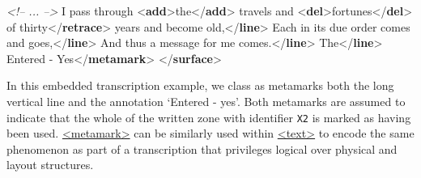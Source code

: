\begin{shaded}
\textit{<!-- ... -->}\mbox{}\newline 
\hspace*{1em}I pass through {<\textbf{add}>}the{</\textbf{add}>} travels and {<\textbf{del}>}fortunes{</\textbf{del}>} of\mbox{}\newline 
\hspace*{1em}thirty{</\textbf{retrace}>}\mbox{}\newline 
\hspace*{1em}\mbox{}\newline 
\hspace*{1em}years and become old,{</\textbf{line}>}\mbox{}\newline 
\hspace*{1em}Each in its due order comes and goes,{</\textbf{line}>}\mbox{}\newline 
\hspace*{1em}And thus a message for me comes.{</\textbf{line}>}\mbox{}\newline 
\hspace*{1em}The{</\textbf{line}>}\mbox{}\newline 
{}\mbox{}\newline 
{}Entered - Yes{</\textbf{metamark}>}\mbox{}\newline 
{</\textbf{surface}>}\end{shaded}\egroup\par \par
In this embedded transcription example, we class as metamarks both the long vertical line and the annotation ‘Entered - yes’.  Both metamarks are assumed to indicate that the whole of the written zone with identifier \texttt{X2} is marked as having been used. \hyperref[TEI.metamark]{<metamark>} can be similarly used within \hyperref[TEI.text]{<text>} to encode the same phenomenon as part of a transcription that privileges logical over physical and layout structures.
